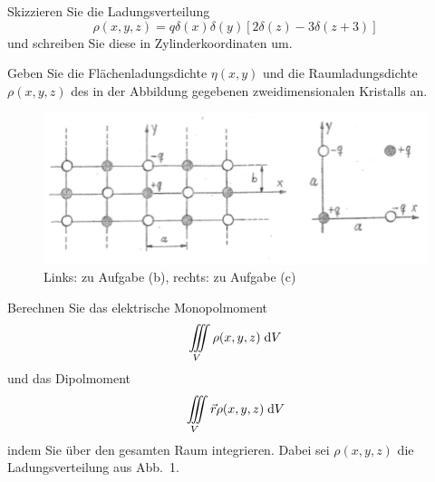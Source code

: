 \documentclass{atistandalonetask}
\begin{document}
  \begin{atiTask}[
    title = Ionenkristalle
  ]
    \begin{atiSubtasks}
    	\item Skizzieren Sie die Ladungsverteilung 
    	\[
    	\rho(x,y,z)=q\delta(x)\delta(y)[2\delta(z)-3\delta(z+3)]
    	\]
    	und schreiben Sie diese in Zylinderkoordinaten um. 
    	\item Geben Sie die Flächenladungsdichte $\eta(x,y)$ und die Raumladungsdichte $\rho(x,y,z)$ des in der Abbildung gegebenen zweidimensionalen Kristalls an.
    	\begin{figure}[H]
		\centering
		\includegraphics[width=0.7\linewidth]{./picture-delta_v}
		\caption{Links: zu Aufgabe (b), rechts: zu Aufgabe (c)}
		\end{figure}
    	\item Berechnen Sie das elektrische Monopolmoment
    	\[
    	\iiint\limits_V\rho(x,y,z)\;\mathrm{d} V
    	\]
    	und das Dipolmoment
    	\[
    	\iiint\limits_V\vec{r}\rho(x,y,z)\;\mathrm{d} V
    	\]
    	indem Sie über den gesamten Raum integrieren. Dabei sei $\rho(x,y,z)$ die Ladungsverteilung aus Abb.~1.
    \end{atiSubtasks}	
  \end{atiTask}
  \begin{atiSolution}

  	
  \end{atiSolution}
\end{document}
